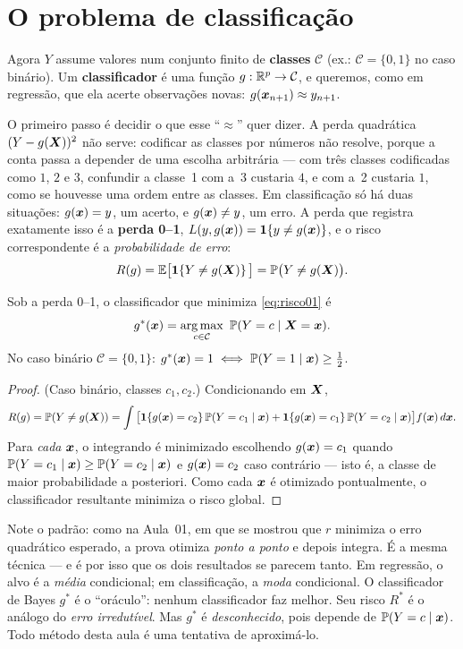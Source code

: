 \documentclass[11pt,a4paper]{article}
\begin{document}
\section{O problema de classificação}
Agora $Y$ assume valores num conjunto finito de \textbf{classes} $\mathcal{C}$ (ex.:
$\mathcal{C}=\{0,1\}$ no caso binário). Um \textbf{classificador} é uma função
$g:\mathbb{R}^p\to\mathcal{C}$, e queremos, como em regressão, que ela acerte observações
novas: $g(\bm{x}_{n+1})\approx y_{n+1}$.

O primeiro passo é decidir o que esse ``$\approx$'' quer dizer. A perda quadrática
$(Y-g(\bm{X}))^2$ não serve: codificar as classes por números não resolve, porque a conta
passa a depender de uma escolha arbitrária --- com três classes codificadas como
$1$, $2$ e $3$, confundir a classe~1 com a~3 custaria $4$, e com a~2 custaria $1$,
como se houvesse uma ordem entre as classes. Em classificação só há duas
situações: $g(\bm{x})=y$, um acerto, e $g(\bm{x})\ne y$, um erro. A perda que registra
exatamente isso é a \textbf{perda 0--1}, $L(y,g(\bm{x}))=\mathbf{1}\!\left\{y\ne g(\bm{x})\right\}$, e o risco
correspondente é a \emph{probabilidade de erro}:
\begin{equation}\label{eq:risco01}
  R(g) = \mathbb{E}\big[\mathbf{1}\!\left\{Y\ne g(\bm{X})\right\}\big] = \mathbb{P}\big(Y\ne g(\bm{X})\big).
\end{equation}

\begin{teorema}\label{teo:bayes}
Sob a perda 0--1, o classificador que minimiza \eqref{eq:risco01} é
\[
  g^*(\x) = \argmax_{c\in\mathcal{C}}\ \Prob(Y=c\mid \X=\x).
\]
No caso binário $\mathcal{C}=\{0,1\}$: $g^*(\bm{x})=1 \iff \mathbb{P}(Y=1\mid\bm{x})\ge \tfrac12$.
\end{teorema}
\begin{proof}
(Caso binário, classes $c_1,c_2$.) Condicionando em $\bm{X}$,
\[
  R(g)=\mathbb{P}(Y\ne g(\bm{X}))
  =\int \big[\mathbf{1}\!\left\{g(\bm{x})=c_2\right\}\mathbb{P}(Y=c_1\mid\bm{x})+\mathbf{1}\!\left\{g(\bm{x})=c_1\right\}\mathbb{P}(Y=c_2\mid\bm{x})\big]f(\bm{x})\,d\bm{x}.
\]
Para \emph{cada} $\bm{x}$, o integrando é minimizado escolhendo $g(\bm{x})=c_1$ quando
$\mathbb{P}(Y=c_1\mid\bm{x})\ge\mathbb{P}(Y=c_2\mid\bm{x})$ e $g(\bm{x})=c_2$ caso contrário --- isto é,
a classe de maior probabilidade a posteriori. Como cada $\bm{x}$ é otimizado
pontualmente, o classificador resultante minimiza o risco global.
\end{proof}

\begin{ideia}
Note o padrão: como na Aula~01, em que se mostrou que $r$ minimiza o erro quadrático
esperado, a prova otimiza \emph{ponto a ponto} e depois integra. É a mesma técnica
--- e é por isso que os dois resultados se parecem tanto. Em regressão, o alvo é a
\emph{média} condicional; em classificação, a \emph{moda} condicional. O
classificador de Bayes $g^*$ é o ``oráculo'': nenhum classificador faz melhor. Seu
risco $R^*$ é o análogo do \emph{erro irredutível}. Mas $g^*$ é
\emph{desconhecido}, pois depende de $\mathbb{P}(Y=c\mid\bm{x})$. Todo método desta aula é
uma tentativa de aproximá-lo.
\end{ideia}
\end{document}
